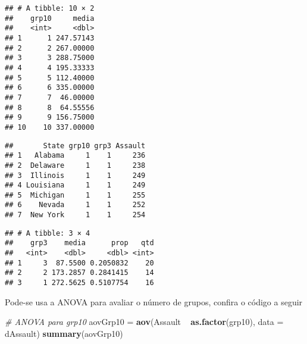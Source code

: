 \documentclass[]{book}
\newenvironment{Shaded}{\begin{snugshade}}{\end{snugshade}}
\newcommand{\KeywordTok}[1]{\textcolor[rgb]{0.13,0.29,0.53}{\textbf{{#1}}}}
\newcommand{\DataTypeTok}[1]{\textcolor[rgb]{0.13,0.29,0.53}{{#1}}}
\newcommand{\DecValTok}[1]{\textcolor[rgb]{0.00,0.00,0.81}{{#1}}}
\newcommand{\StringTok}[1]{\textcolor[rgb]{0.31,0.60,0.02}{{#1}}}
\newcommand{\CommentTok}[1]{\textcolor[rgb]{0.56,0.35,0.01}{\textit{{#1}}}}
\newcommand{\NormalTok}[1]{{#1}}
\begin{document}
\begin{verbatim}
## # A tibble: 10 × 2
##    grp10     media
##    <int>     <dbl>
## 1      1 247.57143
## 2      2 267.00000
## 3      3 288.75000
## 4      4 195.33333
## 5      5 112.40000
## 6      6 335.00000
## 7      7  46.00000
## 8      8  64.55556
## 9      9 156.75000
## 10    10 337.00000
\end{verbatim}

\begin{Shaded}
\end{Shaded}

\begin{verbatim}
##       State grp10 grp3 Assault
## 1   Alabama     1    1     236
## 2  Delaware     1    1     238
## 3  Illinois     1    1     249
## 4 Louisiana     1    1     249
## 5  Michigan     1    1     255
## 6    Nevada     1    1     252
## 7  New York     1    1     254
\end{verbatim}

\begin{Shaded}
\end{Shaded}

\begin{verbatim}
## # A tibble: 3 × 4
##    grp3    media      prop   qtd
##   <int>    <dbl>     <dbl> <int>
## 1     3  87.5500 0.2050832    20
## 2     2 173.2857 0.2841415    14
## 3     1 272.5625 0.5107754    16
\end{verbatim}

Pode-se usa a ANOVA para avaliar o número de grupos, confira o código a
seguir

\begin{Shaded}
\begin{Highlighting}[]
\CommentTok{# ANOVA para grp10}
\NormalTok{aovGrp10 =}\StringTok{ }\KeywordTok{aov}\NormalTok{(Assault ~}\StringTok{ }\KeywordTok{as.factor}\NormalTok{(grp10), }\DataTypeTok{data =} \NormalTok{dAssault)}
\KeywordTok{summary}\NormalTok{(aovGrp10)}
\end{Highlighting}
\end{Shaded}
\end{document}
